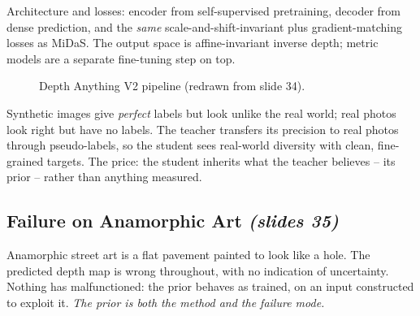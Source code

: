\documentclass[11pt,a4paper]{article}
\numberwithin{equation}{section}
\newcommand{\slides}[1]{\texorpdfstring{\;\emph{(slides #1)}}{ (slides #1)}}
\theoremstyle{plain}
\theoremstyle{definition}
\begin{document}
Architecture and losses: encoder from self-supervised pretraining, decoder from dense prediction, and the \emph{same} scale-and-shift-invariant plus gradient-matching losses as MiDaS. The output space is affine-invariant inverse depth; metric models are a separate fine-tuning step on top.
 
\begin{figure}[htbp]
\centering
{}
\caption{Depth Anything V2 pipeline (redrawn from slide 34).}
\end{figure}
 
\begin{intuition}
Synthetic images give \emph{perfect} labels but look unlike the real world; real photos look right but have no labels. The teacher transfers its precision to real photos through pseudo-labels, so the student sees real-world diversity with clean, fine-grained targets. The price: the student inherits what the teacher believes -- its prior -- rather than anything measured.
\end{intuition}
 
\subsection{Failure on Anamorphic Art \slides{35}}
 
Anamorphic street art is a flat pavement painted to look like a hole. The predicted depth map is wrong throughout, with no indication of uncertainty. Nothing has malfunctioned: the prior behaves as trained, on an input constructed to exploit it. \emph{The prior is both the method and the failure mode.}
\end{document}

